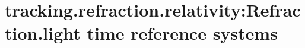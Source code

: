 \section{ tracking.refraction.relativity:Refraction.light time reference systems }\label{sec:q2}    
